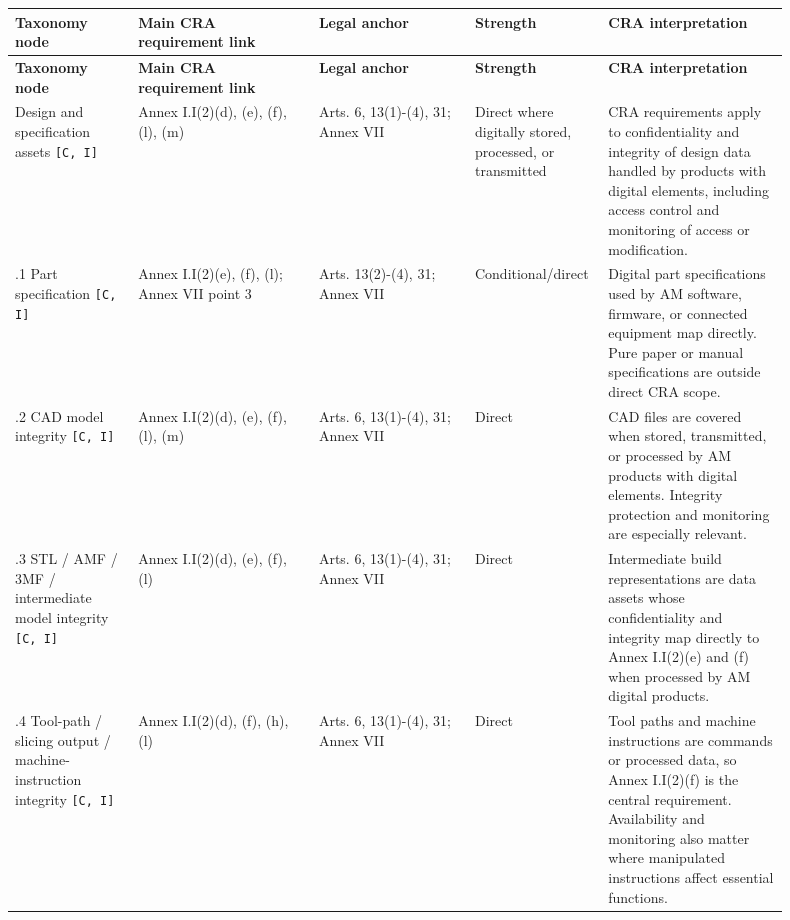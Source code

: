 \documentclass[10pt,a4paper,oneside]{report}
\begin{document}
\begin{landscape}
\begingroup
\scriptsize
\setlength{\tabcolsep}{4pt}
\begin{longtable}{@{}>{\RaggedRight\arraybackslash}p{0.15\linewidth}>{\RaggedRight\arraybackslash}p{0.22\linewidth}>{\RaggedRight\arraybackslash}p{0.19\linewidth}>{\RaggedRight\arraybackslash}p{0.12\linewidth}>{\RaggedRight\arraybackslash}p{0.22\linewidth}@{}}
\toprule
\textbf{Taxonomy node} & \textbf{Main CRA requirement link} & \textbf{Legal anchor} & \textbf{Strength} & \textbf{CRA interpretation} \\
\midrule
\endfirsthead
\toprule
\textbf{Taxonomy node} & \textbf{Main CRA requirement link} & \textbf{Legal anchor} & \textbf{Strength} & \textbf{CRA interpretation} \\
\midrule
\endhead
2.1 Design and specification assets \texttt{[C, I]} & Annex I.I(2)(d), (e), (f), (l), (m) & Arts. 6, 13(1)-(4), 31; Annex VII & Direct where digitally stored, processed, or transmitted & CRA requirements apply to confidentiality and integrity of design data handled by products with digital elements, including access control and monitoring of access or modification. \\
2.1.1 Part specification \texttt{[C, I]} & Annex I.I(2)(e), (f), (l); Annex VII point 3 & Arts. 13(2)-(4), 31; Annex VII & Conditional/direct & Digital part specifications used by AM software, firmware, or connected equipment map directly. Pure paper or manual specifications are outside direct CRA scope. \\
2.1.2 CAD model integrity \texttt{[C, I]} & Annex I.I(2)(d), (e), (f), (l), (m) & Arts. 6, 13(1)-(4), 31; Annex VII & Direct & CAD files are covered when stored, transmitted, or processed by AM products with digital elements. Integrity protection and monitoring are especially relevant. \\
2.1.3 STL / AMF / 3MF / intermediate model integrity \texttt{[C, I]} & Annex I.I(2)(d), (e), (f), (l) & Arts. 6, 13(1)-(4), 31; Annex VII & Direct & Intermediate build representations are data assets whose confidentiality and integrity map directly to Annex I.I(2)(e) and (f) when processed by AM digital products. \\
2.1.4 Tool-path / slicing output / machine-instruction integrity \texttt{[C, I]} & Annex I.I(2)(d), (f), (h), (l) & Arts. 6, 13(1)-(4), 31; Annex VII & Direct & Tool paths and machine instructions are commands or processed data, so Annex I.I(2)(f) is the central requirement. Availability and monitoring also matter where manipulated instructions affect essential functions. \\

\end{longtable}
\end{landscape}
\end{document}
